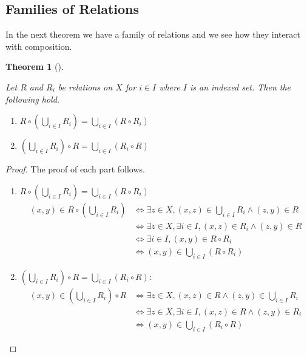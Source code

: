 \documentclass[
  letterpaper,
  10pt,
  reqno,
  twopage,
  openany]{book}
\providecommand{\tightlist}{%
  \setlength{\itemsep}{0pt}\setlength{\parskip}{0pt}}\usepackage{longtable,booktabs,array}
\theoremstyle{plain}
\theoremstyle{definition}
\theoremstyle{definition}
\theoremstyle{definition}
\theoremstyle{plain}
\theoremstyle{plain}
\newtheorem{theorem}{Theorem}[chapter]
\theoremstyle{remark}
\begin{document}
\hypertarget{families-of-relations}{%
\subsection{Families of Relations}\label{families-of-relations}}

In the next theorem we have a family of relations and we see how they
interact with composition.

\leavevmode{}%
\begin{theorem}[]\label{thm-relations-indexed}

Let \(R\) and \(R_i\) be relations on \(X\) for \(i\in I\) where \(I\)
is an indexed set. Then the following hold.

\begin{enumerate}
\def\labelenumi{\arabic{enumi}.}
\tightlist
\item
  \(R\circ \left(\bigcup_{i\in I} R_i\right)=\bigcup_{i\in I}(R\circ R_i)\)
\item
  \(\left(\bigcup_{i\in I} R_i\right)\circ R=\bigcup_{i\in I}(R_i\circ R)\)
\end{enumerate}

\end{theorem}

\begin{proof}

The proof of each part follows.

\begin{enumerate}
\def\labelenumi{(\arabic{enumi})}
\item
  \(R\circ \left(\bigcup_{i\in I} R_i\right)=\bigcup_{i\in I}(R\circ R_i)\)
  \begin{align*}
  (x,y)\in R\circ \left(\bigcup_{i\in I} R_i\right) & \Longleftrightarrow \exists z\in X, (x,z)\in \bigcup_{i\in I} R_i \land (z,y)\in R \\ 
  & \Longleftrightarrow \exists z\in X, \exists i\in I, (x,z)\in R_i \land (z,y)\in R \\ 
  & \Longleftrightarrow \exists i\in I, (x,y)\in R\circ R_i  \\ 
  & \Longleftrightarrow (x,y) \in \bigcup_{i\in I}(R\circ R_i)
  \end{align*}
\item
  \(\left(\bigcup_{i\in I} R_i\right)\circ R=\bigcup_{i\in I}(R_i\circ R)\):
  \begin{align*}
  (x,y)\in \left(\bigcup_{i\in I} R_i\right)\circ R
  & \Longleftrightarrow \exists z\in X, (x,z)\in R \land (z,y)\in \bigcup_{i\in I} R_i \\
  & \Longleftrightarrow \exists z\in X, \exists i\in I, (x,z)\in R \land (z,y)\in R_i \\
  & \Longleftrightarrow (x,y)\in \bigcup_{i\in I}(R_i\circ R)
  \end{align*}
\end{enumerate}

\end{proof}
\end{document}
